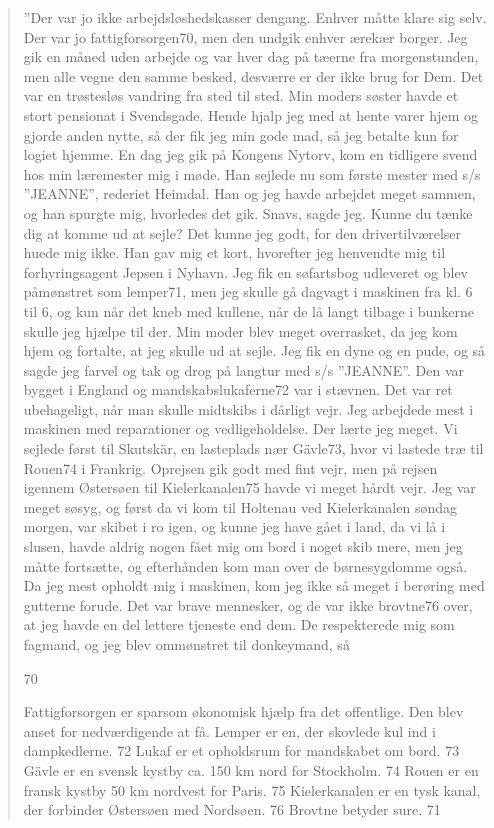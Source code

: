 \begin{quote}
''Der var jo ikke
arbejdsløshedskasser dengang. Enhver måtte klare sig selv. Der var jo
fattigforsorgen70, men den undgik enhver ærekær borger. Jeg gik en måned
uden arbejde og var hver dag på tæerne fra morgenstunden, men alle vegne
den samme besked, desværre er der ikke brug for Dem. Det var en
trøstesløs vandring fra sted til sted. Min moders søster havde et stort
pensionat i Svendsgade. Hende hjalp jeg med at hente varer hjem og
gjorde anden nytte, så der fik jeg min gode mad, så jeg betalte kun for
logiet hjemme. En dag jeg gik på Kongens Nytorv, kom en tidligere svend
hos min læremester mig i møde. Han sejlede nu som første mester med s/s
''JEANNE'', rederiet Heimdal. Han og jeg havde arbejdet meget sammen, og
han spurgte mig, hvorledes det gik. Snavs, sagde jeg. Kunne du tænke dig
at komme ud at sejle? Det kunne jeg godt, for den drivertilværelser
huede mig ikke. Han gav mig et kort, hvorefter jeg henvendte mig til
forhyringsagent Jepsen i Nyhavn. Jeg fik en søfartsbog udleveret og blev
påmønstret som lemper71, men jeg skulle gå dagvagt i maskinen fra kl. 6
til 6, og kun når det kneb med kullene, når de lå langt tilbage i
bunkerne skulle jeg hjælpe til der. Min moder blev meget overrasket, da
jeg kom hjem og fortalte, at jeg skulle ud at sejle. Jeg fik en dyne og
en pude, og så sagde jeg farvel og tak og drog på langtur med s/s
''JEANNE''. Den var bygget i England og mandskabslukaferne72 var i
stævnen. Det var ret ubehageligt, når man skulle midtskibs i dårligt
vejr. Jeg arbejdede mest i maskinen med reparationer og vedligeholdelse.
Der lærte jeg meget. Vi sejlede først til Skutskär, en lasteplads nær
Gävle73, hvor vi lastede træ til Rouen74 i Frankrig. Oprejsen gik godt
med fint vejr, men på rejsen igennem Østersøen til Kielerkanalen75 havde
vi meget hårdt vejr. Jeg var meget søsyg, og først da vi kom til
Holtenau ved Kielerkanalen søndag morgen, var skibet i ro igen, og kunne
jeg have gået i land, da vi lå i slusen, havde aldrig nogen fået mig om
bord i noget skib mere, men jeg måtte fortsætte, og efterhånden kom man
over de børnesygdomme også. Da jeg mest opholdt mig i maskinen, kom jeg
ikke så meget i berøring med gutterne forude. Det var brave mennesker,
og de var ikke brovtne76 over, at jeg havde en del lettere tjeneste end
dem. De respekterede mig som fagmand, og jeg blev ommønstret til
donkeymand, så

70

Fattigforsorgen er sparsom økonomisk hjælp fra det offentlige. Den blev
anset for nedværdigende at få. Lemper er en, der skovlede kul ind i
dampkedlerne. 72 Lukaf er et opholdsrum for mandskabet om bord. 73 Gävle
er en svensk kystby ca. 150 km nord for Stockholm. 74 Rouen er en fransk
kystby 50 km nordvest for Paris. 75 Kielerkanalen er en tysk kanal, der
forbinder Østersøen med Nordsøen. 76 Brovtne betyder sure. 71


\end{quote}
